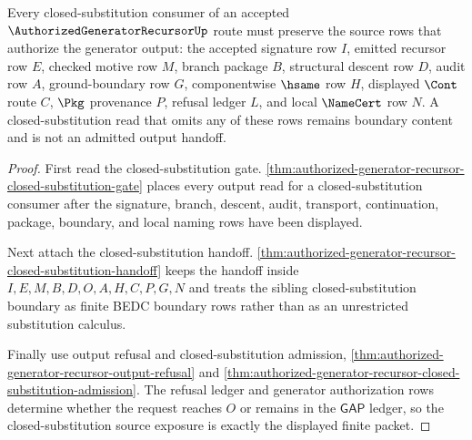\begin{theorem}
\label{thm:authorized-generator-recursor-closed-substitution-source-exposure}
Every closed-substitution consumer of an accepted $\AuthorizedGeneratorRecursorUp$ route must preserve the source rows that authorize the generator output: the accepted signature row $I$, emitted recursor row $E$, checked motive row $M$, branch package $B$, structural descent row $D$, audit row $A$, ground-boundary row $G$, componentwise $\hsame$ row $H$, displayed $\Cont$ route $C$, $\Pkg$ provenance $P$, refusal ledger $L$, and local $\NameCert$ row $N$. A closed-substitution read that omits any of these rows remains boundary content and is not an admitted output handoff.
\end{theorem}
\begin{proof}
First read the closed-substitution gate. \autoref{thm:authorized-generator-recursor-closed-substitution-gate} places every output read for a closed-substitution consumer after the signature, branch, descent, audit, transport, continuation, package, boundary, and local naming rows have been displayed.

Next attach the closed-substitution handoff. \autoref{thm:authorized-generator-recursor-closed-substitution-handoff} keeps the handoff inside $I,E,M,B,D,O,A,H,C,P,G,N$ and treats the sibling closed-substitution boundary as finite BEDC boundary rows rather than as an unrestricted substitution calculus.

Finally use output refusal and closed-substitution admission, \autoref{thm:authorized-generator-recursor-output-refusal} and \autoref{thm:authorized-generator-recursor-closed-substitution-admission}. The refusal ledger and generator authorization rows determine whether the request reaches $O$ or remains in the $\mathsf{GAP}$ ledger, so the closed-substitution source exposure is exactly the displayed finite packet.
\end{proof}

